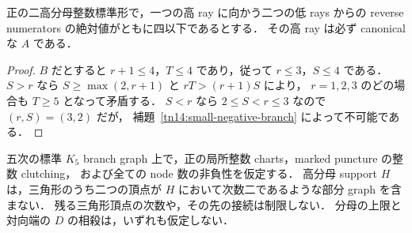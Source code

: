 \begin{lemma}
\label{tn14:small-reverse-ray}
正の二高分母整数標準形で，一つの高 ray に向かう二つの低 rays からの
reverse numerators の絶対値がともに四以下であるとする．
その高 ray は必ず canonical な $A$ である．
\end{lemma}

\begin{proof}
$B$ だとすると $r+1\leq4$，$T\leq4$ であり，従って $r\leq3$，$S\leq4$ である．
$S>r$ なら $S\geq\max(2,r+1)$ と $rT>(r+1)S$ により，
$r=1,2,3$ のどの場合も $T\geq5$ となって矛盾する．
$S<r$ なら $2\leq S<r\leq3$ なので $(r,S)=(3,2)$ だが，
補題~\ref{tn14:small-negative-branch} によって不可能である．
\end{proof}

\begin{theorem}[二つの二価頂点を持つ三角形の不存在]
\label{tn14:no-degree-two-triangle}
五次の標準 $K_5$ branch graph 上で，正の局所整数 charts，marked puncture の整数 clutching，
および全ての node 数の非負性を仮定する．
高分母 support $H$ は，三角形のうち二つの頂点が $H$ において次数二であるような部分 graph を含まない．
残る三角形頂点の次数や，その先の接続は制限しない．
分母の上限と対向端の $D$ の相殺は，いずれも仮定しない．
\end{theorem}

